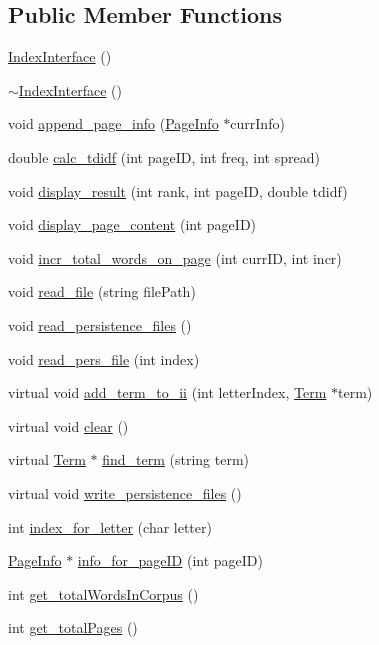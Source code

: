 \subsection*{Public Member Functions}
\begin{DoxyCompactItemize}
\item 
\hyperlink{class_index_interface_a7b1e7eae7faa652d2f63efeecf0ca2de}{Index\+Interface} ()
\item 
\hyperlink{class_index_interface_a3927fabe77a7da5845dc0495b2c1c2b2}{$\sim$\+Index\+Interface} ()
\item 
void \hyperlink{class_index_interface_a7f082789ce91eaaacc10a5c841b62cd4}{append\+\_\+page\+\_\+info} (\hyperlink{class_page_info}{Page\+Info} $\ast$curr\+Info)
\item 
double \hyperlink{class_index_interface_a8195aee88cd593c2e6ca2e2c48cbd068}{calc\+\_\+tdidf} (int page\+I\+D, int freq, int spread)
\item 
void \hyperlink{class_index_interface_a7e4d5fe8c31cfc9aa02c2dd1d7e1d3aa}{display\+\_\+result} (int rank, int page\+I\+D, double tdidf)
\item 
void \hyperlink{class_index_interface_a3d784385e028557312ef15d59574f9ed}{display\+\_\+page\+\_\+content} (int page\+I\+D)
\item 
void \hyperlink{class_index_interface_a5734b1488a787d47984bf97ffa5aff8d}{incr\+\_\+total\+\_\+words\+\_\+on\+\_\+page} (int curr\+I\+D, int incr)
\item 
void \hyperlink{class_index_interface_a229f1eb93f38d85d78e64e579c46c98a}{read\+\_\+file} (string file\+Path)
\item 
void \hyperlink{class_index_interface_aebcf89c2fd27b815b697c8e9d29e0c3a}{read\+\_\+persistence\+\_\+files} ()
\item 
void \hyperlink{class_index_interface_a0ca6250b71da3983ca31afdf3ee6dd88}{read\+\_\+pers\+\_\+file} (int index)
\item 
virtual void \hyperlink{class_index_interface_aa83b7083d107869e3519c5862bc71d0a}{add\+\_\+term\+\_\+to\+\_\+ii} (int letter\+Index, \hyperlink{class_term}{Term} $\ast$term)
\item 
virtual void \hyperlink{class_index_interface_ad7b88501f360ccfad0c1ee08d793ca25}{clear} ()
\item 
virtual \hyperlink{class_term}{Term} $\ast$ \hyperlink{class_index_interface_a851f0396f0b390cc9aa8cde270afffc9}{find\+\_\+term} (string term)
\item 
virtual void \hyperlink{class_index_interface_a0b4ec5fcc32c08959cffad3a3141dd4e}{write\+\_\+persistence\+\_\+files} ()
\item 
int \hyperlink{class_index_interface_a9a7539d9c7a48bf4d4fbe43961c0547f}{index\+\_\+for\+\_\+letter} (char letter)
\item 
\hyperlink{class_page_info}{Page\+Info} $\ast$ \hyperlink{class_index_interface_a2af7d88c3b2701be9164ba9f4a3bddb3}{info\+\_\+for\+\_\+page\+I\+D} (int page\+I\+D)
\item 
int \hyperlink{class_index_interface_a8a0132ad6e84c4340061496c615f581c}{get\+\_\+total\+Words\+In\+Corpus} ()
\item 
int \hyperlink{class_index_interface_af9edc24ac00bdf2c0e06384f890a1d8a}{get\+\_\+total\+Pages} ()
\end{DoxyCompactItemize}
